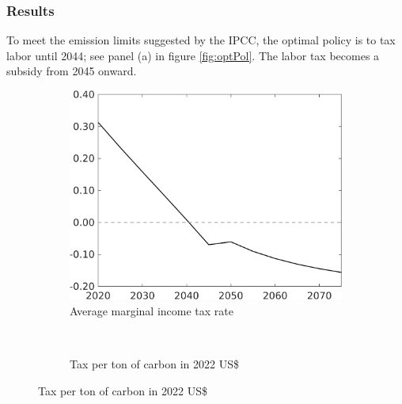 \subsubsection{Results}\label{sec:optres}
To meet the emission limits suggested by the IPCC, the optimal policy is to tax labor until 2044; see panel (a) in figure \ref{fig:optPol}. The labor tax becomes a subsidy from 2045 onward. 
\begin{figure}[h!!]
	\centering
	\caption{Optimal Policy }\label{fig:optPol}
	\begin{subfigure}{0.4\textwidth}
		\caption{Average marginal income tax rate }
		\includegraphics[width=1\textwidth]{../../codding_model/own_basedOnFried/optimalPol_010922_revision/figures/all_13Sept22_Tplus30/dTaulAv_OPT_T_NoTaus_COMPtaul_regime4_spillover0_knspil0_noskill0_sep0_xgrowth0_PV1_etaa0.79_lgd0.png}
	\end{subfigure}
\begin{minipage}[]{0.1\textwidth}
	\
\end{minipage}
	\begin{subfigure}{0.4\textwidth}
		\caption{Tax per ton of carbon in 2022 US\$ }

\end{subfigure}
\end{figure}
